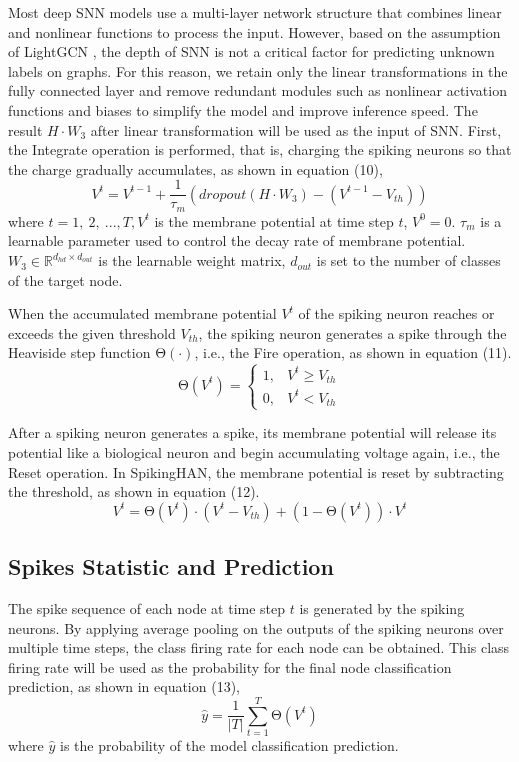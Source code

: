 \documentclass[letterpaper]{article} %
\begin{document}
Most deep SNN models use a multi-layer network structure that combines linear and nonlinear functions to process the input. However, based on the assumption of LightGCN \cite{bib35}, the depth of SNN is not a critical factor for predicting unknown labels on graphs. For this reason, we retain only the linear transformations in the fully connected layer and remove redundant modules such as nonlinear activation functions and biases to simplify the model and improve inference speed. The result $H\cdot W_3$ after linear transformation will be used as the input of SNN. First, the Integrate operation is performed, that is, charging the spiking neurons so that the charge gradually accumulates, as shown in equation (10), 
\begin{equation}
V^t=V^{t-1}+\frac{1}{\tau_m}\left(dropout\left(H\cdot W_3\right)-\left(V^{t-1}-V_{th}\right)\right)
\label{eq10}
\end{equation}
where $t=1,\ 2,\ ...,T, V^t$ is the membrane potential at time step $t$, $V^0=0$. $\tau_m$ is a learnable parameter used to control the decay rate of membrane potential. $W_3\in\mathbb{R}^{d_{hd}\times d_{out}}$ is the learnable weight matrix, $d_{out}$ is set to the number of classes of the target node.

When the accumulated membrane potential $V^t$ of the spiking neuron reaches or exceeds the given threshold $V_{th}$, the spiking neuron generates a spike through the Heaviside step function $\mathrm{\Theta}(\cdot)$, i.e., the Fire operation, as shown in equation (11).
\begin{equation}
\mathrm{\Theta}(V^t)=
\begin{cases}
1, & V^t\geq V_{th} \\
0, & V^t<V_{th} 
\end{cases}
\label{eq11}
\end{equation}

After a spiking neuron generates a spike, its membrane potential will release its potential like a biological neuron and begin accumulating voltage again, i.e., the Reset operation. In SpikingHAN, the membrane potential is reset by subtracting the threshold, as shown in equation (12).
\begin{equation}
V^t=\mathrm{\Theta}\left(V^t\right)\cdot\left(V^t-V_{th}\right)+\left(1-\mathrm{\Theta}\left(V^t\right)\right)\cdot V^t
\label{eq12}
\end{equation}

\subsection{Spikes Statistic and Prediction}
The spike sequence of each node at time step $t$ is generated by the spiking neurons. By applying average pooling on the outputs of the spiking neurons over multiple time steps, the class firing rate for each node can be obtained. This class firing rate will be used as the probability for the final node classification prediction, as shown in equation (13), 
\begin{equation}
\hat{y}=\frac{1}{\left|T\right|}\sum_{t=1}^{T}\mathrm{\Theta}\left(V^t\right)
\label{eq13}
\end{equation}
where $\hat{y}$ is the probability of the model classification prediction.
\end{document}
